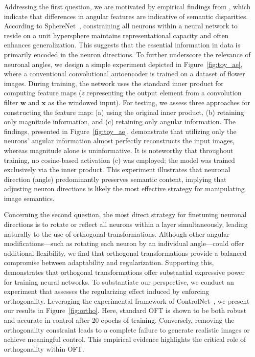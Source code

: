 Addressing the first question, we are motivated by empirical findings from \cite{liu2018decoupled,chen2020angular}, which indicate that differences in angular features are indicative of semantic disparities. According to SphereNet~\cite{liu2017deep}, constraining all neurons within a neural network to reside on a unit hypersphere maintains representational capacity and often enhances generalization. This suggests that the essential information in data is primarily encoded in the neuron directions. To further underscore the relevance of neuronal angles, we design a simple experiment depicted in Figure~\ref{fig:toy_ae}, where a conventional convolutional autoencoder is trained on a dataset of flower images. During training, the network uses the standard inner product for computing feature maps ($z$ representing the output element from a convolution filter $\bm{w}$ and $\bm{x}$ as the windowed input). For testing, we assess three approaches for constructing the feature map: (a) using the original inner product, (b) retaining only magnitude information, and (c) retaining only angular information. The findings, presented in Figure~\ref{fig:toy_ae}, demonstrate that utilizing only the neurons' angular information almost perfectly reconstructs the input images, whereas magnitude alone is uninformative. It is noteworthy that throughout training, no cosine-based activation (c) was employed; the model was trained exclusively via the inner product. This experiment illustrates that neuronal direction (angle) predominantly preserves semantic content, implying that adjusting neuron directions is likely the most effective strategy for manipulating image semantics.

Concerning the second question, the most direct strategy for finetuning neuronal directions is to rotate or reflect all neurons within a layer simultaneously, leading naturally to the use of orthogonal transformations. Although other angular modifications—such as rotating each neuron by an individual angle—could offer additional flexibility, we find that orthogonal transformations provide a balanced compromise between adaptability and regularization. Supporting this, \cite{liu2021orthogonal} demonstrates that orthogonal transformations offer substantial expressive power for training neural networks. To substantiate our perspective, we conduct an experiment that assesses the regularizing effect induced by enforcing orthogonality. Leveraging the experimental framework of ControlNet~\cite{zhang2023adding}, we present our results in Figure~\ref{fig:ortho}. Here, standard OFT is shown to be both robust and accurate in control after 20 epochs of training. Conversely, removing the orthogonality constraint leads to a complete failure to generate realistic images or achieve meaningful control. This empirical evidence highlights the critical role of orthogonality within OFT.

